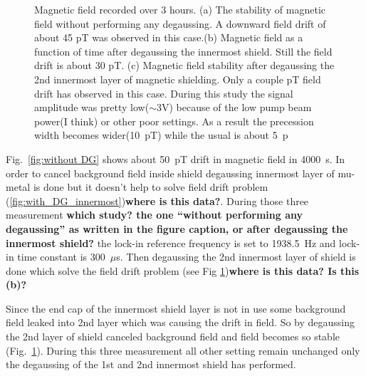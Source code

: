\begin{figure}
\begin{subfigure}[b]{0.45\textwidth}
    \caption{}
    \label{fig:with DG}
  \end{subfigure}
  \caption{Magnetic field recorded over 3 hours. (a) The stability of
    magnetic field without performing any degaussing. A downward field
    drift of about 45 pT was observed in this case.(b) Magnetic field as a function of time after degaussing the innermost shield. Still the field drift is about 30 pT.  (c) Magnetic field
    stability after degaussing the 2nd innermost layer of magnetic
    shielding. Only a couple pT field drift has observed in this case. During this study the signal amplitude was pretty
    low($\sim$3V) because of the low pump beam power(I think) or other poor settings. As a result the precession width becomes wider(10~pT)
  while the usual is about 5~p
    \label{fig:effect of DG}}
\end{figure}

Fig.~\ref{fig:without DG} shows about 50~pT drift in magnetic field in
4000~s.  In order to cancel background field inside shield degaussing
innermost layer of mu-metal is done but it doesn't help to solve field
drift problem (\ref{fig:with_DG_innermost}){\bf where is this data?}. During those three measurement {\bf which
  study? the one ``without performing any degaussing'' as written in
  the figure caption, or after degaussing the innermost shield?}  the
lock-in reference frequency is set to 1938.5~Hz and lock-in time
constant is 300~$\mu$s.  Then degaussing the 2nd innermost layer of
shield is done which solve the field drift problem (see Fig \ref{fig:with DG}){\bf where is this
  data?  Is this (b)?}%

Since the end cap of the innermost shield layer is not in use some
background field leaked into 2nd layer which was causing the drift in
field. So by degaussing the 2nd layer of shield canceled background
field and field becomes so stable (Fig.~\ref{fig:with DG}). During this
three measurement all other setting remain unchanged only the degaussing
of the 1st and 2nd innermost shield has performed.
   
  
